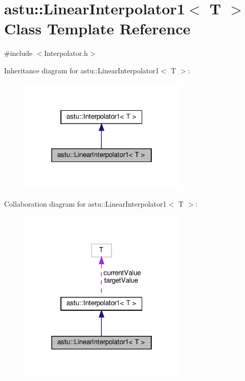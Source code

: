 \hypertarget{classastu_1_1LinearInterpolator1}{}\section{astu\+:\+:Linear\+Interpolator1$<$ T $>$ Class Template Reference}
\label{classastu_1_1LinearInterpolator1}


{\ttfamily \#include $<$Interpolator.\+h$>$}



Inheritance diagram for astu\+:\+:Linear\+Interpolator1$<$ T $>$\+:\nopagebreak
\begin{figure}[H]
\begin{center}
\leavevmode
\includegraphics[width=226pt]{classastu_1_1LinearInterpolator1__inherit__graph}
\end{center}
\end{figure}


Collaboration diagram for astu\+:\+:Linear\+Interpolator1$<$ T $>$\+:\nopagebreak
\begin{figure}[H]
\begin{center}
\leavevmode
\includegraphics[width=226pt]{classastu_1_1LinearInterpolator1__coll__graph}
\end{center}
\end{figure}
